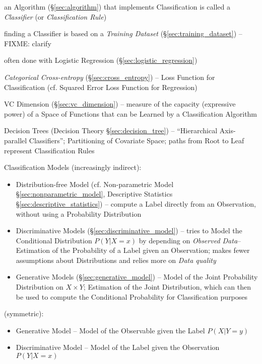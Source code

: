 an Algorithm (\S\ref{sec:algorithm}) that implements Classification is called a
\emph{Classifier} (or \emph{Classification Rule})

finding a Classifier is based on a \emph{Training Dataset}
(\S\ref{sec:training_dataset}) --FIXME: clarify

often done with Logistic Regression (\S\ref{sec:logistic_regression})

\emph{Categorical Cross-entropy} (\S\ref{sec:cross_entropy}) -- Loss Function
for Classification (cf. Squared Error Loss Function for Regression)

\fist VC Dimension (\S\ref{sec:vc_dimension}) -- measure of the capacity
(expressive power) of a Space of Functions that can be Learned by a
Classification Algorithm

\fist Decision Trees (Decision Theory \S\ref{sec:decision_tree}) --
``Hierarchical Axis-parallel Classifiers''; Partitioning of Covariate Space;
paths from Root to Leaf represent Classification Rules

Classification Models (increasingly indirect):
\begin{itemize}
  \item Distribution-free Model (cf. Non-parametric Model
    \S\ref{sec:nonparametric_model}, Descriptive Statistics
    \S\ref{sec:descriptive_statistics}) -- compute a Label directly from an
    Observation, without using a Probability Distribution
  \item Discriminative Models (\S\ref{sec:discriminative_model}) -- tries to
    Model the Conditional Distribution $P(Y|X = x)$ by depending on
    \emph{Observed Data}-- Estimation of the Probability of a Label given an
    Observation; makes fewer assumptions about Distributions and relies
    more on \emph{Data quality}
  \item Generative Models (\S\ref{sec:generative_model}) -- Model of the
    Joint Probability Distribution on $X \times Y$; Estimation of the Joint
    Distribution, which can then be used to compute the Conditional Probability
    for Classification purposes
\end{itemize}

(symmetric):
\begin{itemize}
  \item Generative Model -- Model of the Observable given the Label $P(X|Y = y)$
  \item Discriminative Model -- Model of the Label given the Observation
    $P(Y|X = x)$
\end{itemize}

